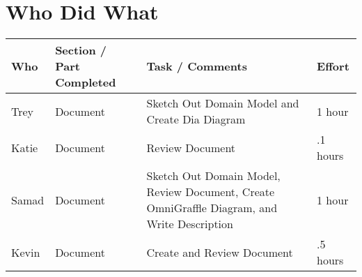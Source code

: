 \clearpage
\section{Who Did What}
\begin{table}[!h]
    \begin{tabular}{|p{2.5cm}|p{4.5cm}|p{4.5cm}|p{2.5cm}|}
   	\hline
	 Who   & Section / Part Completed & Task / Comments & Effort \\
	 \hline
	  Trey  & Document & Sketch Out Domain Model and Create Dia Diagram & 1 hour \\
   	 \hline
	 Katie & Document & Review Document & .1 hours \\
 	 \hline
	 Samad & Document & Sketch Out Domain Model, Review Document, Create OmniGraffle Diagram, and Write Description & 1 hour \\
 	 \hline
	 Kevin & Document & Create and Review Document & .5 hours \\
 	 \hline
    \end{tabular}
\end{table}
